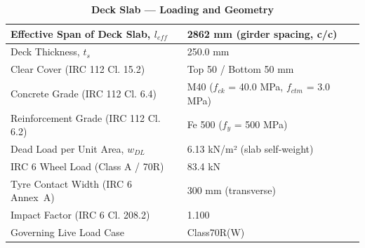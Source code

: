 \documentclass[12pt,a4paper]{report}
\numberwithin{table}{chapter}
\numberwithin{figure}{chapter}
\begin{document}
\vspace{1em}
\begin{longtable}{|L{5.5cm}|p{10.0cm}|}
\caption{\textbf{Deck Slab --- Loading and Geometry}}\\
\hline
\textnormal{Effective Span of Deck Slab, $l_{eff}$} & 2862 mm (girder spacing, c/c) \\[6pt]
\hline
\textnormal{Deck Thickness, $t_s$} & 250.0 mm \\[6pt]
\hline
\textnormal{Clear Cover (IRC 112 Cl. 15.2)} & Top 50 / Bottom 50 mm \\[6pt]
\hline
\textnormal{Concrete Grade (IRC 112 Cl. 6.4)} & M40 ($f_{ck}$ = 40.0 MPa, $f_{ctm}$ = 3.0 MPa) \\[6pt]
\hline
\textnormal{Reinforcement Grade (IRC 112 Cl. 6.2)} & Fe 500 ($f_y$ = 500 MPa) \\[6pt]
\hline
\textnormal{Dead Load per Unit Area, $w_{DL}$} & 6.13 kN/m² (slab self-weight) \\[6pt]
\hline
\textnormal{IRC 6 Wheel Load (Class A / 70R)} & 83.4 kN \\[6pt]
\hline
\textnormal{Tyre Contact Width (IRC 6 Annex~A)} & 300 mm (transverse) \\[6pt]
\hline
\textnormal{Impact Factor (IRC 6 Cl. 208.2)} & 1.100 \\[6pt]
\hline
\textnormal{Governing Live Load Case} & Class70R(W) \\[6pt]
\hline
\end{longtable}
\end{document}
